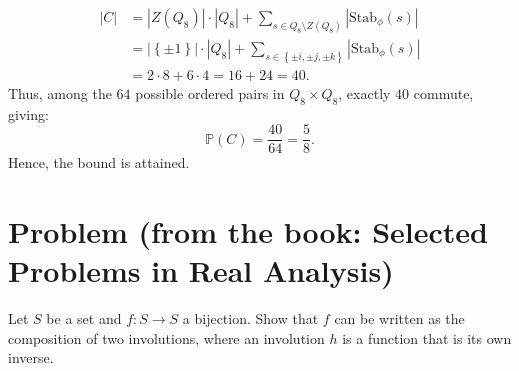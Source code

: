 \documentclass[11pt, a4paper, oneside]{article}
\newcommand{\problem}[1][]{\section{#1} \hfill \par}
\theoremstyle{remark}
\theoremstyle{lemma}
\begin{document}
\begin{align*}
|C| &= \left| Z(Q_8) \right| \cdot \left| Q_8 \right| + \sum_{s \in Q_8\setminus Z(Q_8)} \left| \mathrm{Stab}_{\phi}\left( s \right) \right|\\
&=\left| \left\{ \pm 1 \right\} \right| \cdot \left| Q_8 \right| + \sum_{s \in \left\{ \pm i, \pm j, \pm k \right\}} \left| \mathrm{Stab}_{\phi}\left( s \right) \right|\\
&= 2 \cdot 8 + 6 \cdot 4 = 16 + 24 = 40.
\end{align*}
Thus, among the \( 64 \) possible ordered pairs in \( Q_8 \times Q_8 \), exactly \( 40 \) commute, giving:
\[
\mathbb{P}(C) = \frac{40}{64} = \frac{5}{8}.
\]
Hence, the bound is attained.




\newpage
\problem[Problem (from the book: Selected Problems in Real Analysis)]
Let \( S \) be a set and \( f: S \rightarrow S \) a bijection. Show that \( f \) can be written as the composition of two involutions, where an involution \( h \) is a function that is its own inverse.
\end{document}
